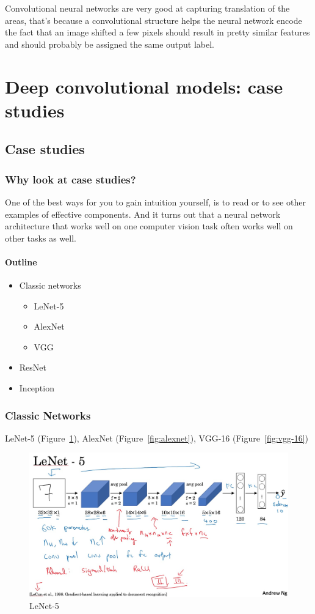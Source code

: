 \documentclass[UTF8]{article}
\begin{document}
Convolutional neural networks are very good at capturing translation of the areas, that's because
a convolutional structure helps the neural network encode the fact that an image shifted a few
pixels should result in pretty similar features and should probably be assigned the same output
label.

\section{Deep convolutional models: case studies}
\subsection{Case studies}
\subsubsection{Why look at case studies?}
One of the best ways for you to gain intuition yourself, is to read or to see other examples of
effective components. And it turns out that a neural network architecture that works well on one
computer vision task often works well on other tasks as well.

\paragraph{Outline}
\begin{itemize}
    \item Classic networks
    \begin{itemize}
        \item LeNet-5
        \item AlexNet
        \item VGG
    \end{itemize}
    \item ResNet
    \item Inception
\end{itemize}

\subsubsection{Classic Networks}
LeNet-5 (Figure~\ref{fig:lenet-5}), AlexNet (Figure~\ref{fig:alexnet}), VGG-16
(Figure~\ref{fig:vgg-16})

\begin{figure}[htb]
    \centering
    \includegraphics[width=40em]{figures/lenet-5}
    \caption{LeNet-5}
    \label{fig:lenet-5}
\end{figure}
\end{document}
